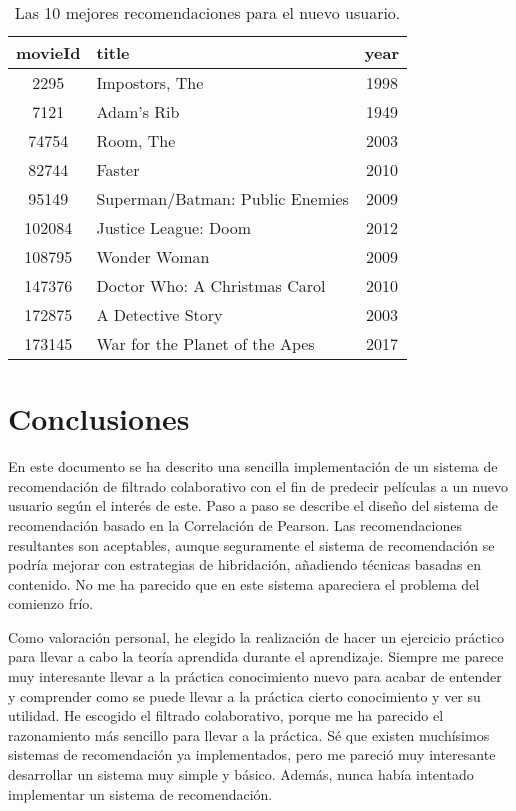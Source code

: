\documentclass{uimppracticas}
\begin{document}
\begin{table}[H]
	\centering
	\begin{tabular}{clc}
		\toprule
		movieId &                         title &  year \\
		\midrule
		2295 &                   Impostors, The &  1998 \\
		7121 &                       Adam's Rib &  1949 \\
		74754 &                        Room, The &  2003 \\
		82744 &                           Faster &  2010 \\
		95149 &  Superman/Batman: Public Enemies &  2009 \\
		102084 &             Justice League: Doom &  2012 \\
		108795 &                     Wonder Woman &  2009 \\
		147376 &    Doctor Who: A Christmas Carol &  2010 \\
		172875 &                A Detective Story &  2003 \\
		173145 &   War for the Planet of the Apes &  2017 \\
		\bottomrule
	\end{tabular}
	\caption{Las 10 mejores recomendaciones para el nuevo usuario.}
	\label{recomendaciones_finales}
\end{table}



\section{Conclusiones}

En este documento se ha descrito una sencilla implementación de un sistema de recomendación de filtrado colaborativo con el fin de predecir películas a un nuevo usuario según el interés de este. Paso a paso se describe el diseño del sistema de recomendación basado en la Correlación de Pearson. Las recomendaciones resultantes son aceptables, aunque seguramente el sistema de recomendación se podría mejorar con estrategias de hibridación, añadiendo técnicas basadas en contenido. No me ha parecido que en este sistema apareciera el problema del comienzo frío.

Como valoración personal, he elegido la realización de hacer un ejercicio práctico para llevar a cabo la teoría aprendida durante el aprendizaje. Siempre me parece muy interesante llevar a la práctica conocimiento nuevo para acabar de entender y comprender como se puede llevar a la práctica cierto conocimiento y ver su utilidad. He escogido el filtrado colaborativo, porque me ha parecido el razonamiento más sencillo para llevar a la práctica. Sé que existen muchísimos sistemas de recomendación ya implementados, pero me pareció muy interesante desarrollar un sistema muy simple y básico. Además, nunca había intentado implementar un sistema de recomendación.
\end{document}

